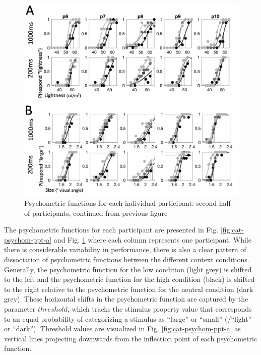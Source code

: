 \documentclass[a4paper, nobind]{templates/ociamthesis}
\begin{document}
\begin{figure}

{\centering \includegraphics[width=0.9\linewidth]{figures/cat-psychom-ppt-b} 

}

\caption[Experiment 1, Psychometric functions, part 2]{Psychometric functions for each individual participant: second half of participants, continued from previous figure}\label{fig:cat-psychom-ppt-b}
\end{figure}

The psychometric functions for each participant are presented in Fig. \ref{fig:cat-psychom-ppt-a} and Fig. \ref{fig:cat-psychom-ppt-b} where each column represents one participant. While there is considerable variability in performance, there is also a clear pattern of dissociation of psychometric functions between the different context conditions. Generally, the psychometric function for the low condition (light grey) is shifted to the left and the psychometric function for the high condition (black) is shifted to the right relative to the psychometric function for the neutral condition (dark grey). These horizontal shifts in the psychometric function are captured by the parameter \(threshold\), which tracks the stimulus property value that corresponds to an equal probability of categorizing a stimulus as ``large'' or ``small'' (/``light'' or ``dark''). Threshold values are visualized in Fig. \ref{fig:cat-psychom-ppt-a} as vertical lines projecting downwards from the inflection point of each psychometric function.
\end{document}
